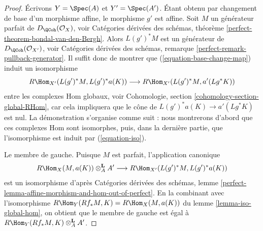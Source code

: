 \begin{proof}
Écrivons $Y = \Spec(A)$ et $Y' = \Spec(A')$. Étant obtenu par changement de base d'un morphisme affine, le morphisme $g'$ est affine. Soit $M$ un générateur parfait de $D_\QCoh(\mathcal{O}_X)$, voir Catégories dérivées des schémas, théorème \ref{perfect-theorem-bondal-van-den-Bergh}. Alors $L(g')^*M$ est un générateur de $D_\QCoh(\mathcal{O}_{X'})$, voir Catégories dérivées des schémas, remarque \ref{perfect-remark-pullback-generator}. Il suffit donc de montrer que (\ref{equation-base-change-map}) induit un isomorphisme
\begin{equation}
\label{equation-iso}
R\Hom_{X'}(L(g')^*M, L(g')^*a(K))
\longrightarrow
R\Hom_{X'}(L(g')^*M, a'(Lg^*K))
\end{equation}
entre les complexes Hom globaux, voir Cohomologie, section \ref{cohomology-section-global-RHom}, car cela impliquera que le cône de $L(g')^*a(K) \to a'(Lg^*K)$ est nul. La démonstration s'organise comme suit : nous montrerons d'abord que ces complexes Hom sont isomorphes, puis, dans la dernière partie, que l'isomorphisme est induit par (\ref{equation-iso}).

\medskip\noindent
Le membre de gauche. Puisque $M$ est parfait, l'application canonique
$$
R\Hom_X(M, a(K)) \otimes^\mathbf{L}_A A'
\longrightarrow
R\Hom_{X'}(L(g')^*M, L(g')^*a(K))
$$
est un isomorphisme d'après Catégories dérivées des schémas, lemme \ref{perfect-lemma-affine-morphism-and-hom-out-of-perfect}. En la combinant avec l'isomorphisme
$R\Hom_Y(Rf_*M, K) = R\Hom_X(M, a(K))$
du lemme \ref{lemma-iso-global-hom}, on obtient que le membre de gauche est égal à $R\Hom_Y(Rf_*M, K) \otimes^\mathbf{L}_A A'$.


\end{proof}
